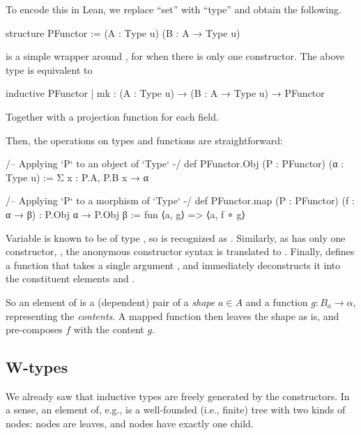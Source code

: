 To encode this in Lean, we replace ``set'' with ``type'' and obtain the following.
\begin{leancode}
    structure PFunctor := (A : Type u) (B : A → Type u)
\end{leancode}

\begin{remark}
     is a simple wrapper around \inductive{}, for when there is only one constructor.
    The above type is equivalent to
    \begin{leancode}
        inductive PFunctor 
        | mk : (A : Type u) → (B : A → Type u) → PFunctor
    \end{leancode}
    Together with a projection function for each field.
\end{remark}

Then, the operations on types and functions are straightforward:
\begin{leancode}
    /-- Applying `P` to an object of `Type` -/
    def PFunctor.Obj (P : PFunctor) (α : Type u)
        := Σ x : P.A, P.B x → α

    /-- Applying `P` to a morphism of `Type` -/
    def PFunctor.map (P : PFunctor) (f : α → β) : P.Obj α → P.Obj β 
        := fun ⟨a, g⟩ => ⟨a, f ∘ g⟩
\end{leancode}

\begin{remark}
    Variable  is known to be of type , so  is recognized as . Similarly, as  has only one constructor, , the anonymous constructor syntax  is translated to .
    Finally,  defines a function that takes a single argument , and immediately deconstructs it into the constituent elements  and .
\end{remark}

So an element of  is a (dependent) pair of a \emph{shape} $a ∈ A$ and a function $g : B_a \rightarrow \alpha$, representing the \emph{contents}. A mapped function  then leaves the shape as is, and pre-composes $f$ with the content $g$.

\subsection*{W-types}
We already saw that inductive types are freely generated by the constructors. In a sense, an element of, e.g.,  is a well-founded (i.e., finite) tree with two kinds of nodes:  nodes are leaves, and  nodes have exactly one child.

